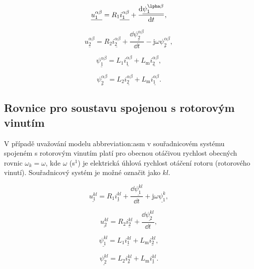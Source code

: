 \documentclass[a4paper, twoside, 11pt]{article}
\begin{document}
 \begin{equation}
     \underline{u_{1}^{\alpha\beta}} = R_1 \underline{i_1^{\alpha\beta}} + \frac{\dd{\underline{\psi_1^{\lpha\beta}}}}{\dd{t}},
    \end{equation}

    \begin{equation}
        \underline{u_{2}^{\alpha\beta}} = R_2 \underline{i_2^{\alpha\beta}} + \frac{\dd{\underline{\psi_2^{\alpha\beta}}}}{\dd{t}} - \text{j} \omega \underline{\psi_2^{\alpha\beta}},
    \end{equation}

    \begin{equation}
        \underline{\psi_1^{\alpha\beta}} = L_1 \underline{i_1^{\alpha\beta}} + L_\text{m} \underline{i_2^{\alpha\beta}},
    \end{equation}

    \begin{equation}
        \underline{\psi_2^{\alpha\beta}} = L_2 \underline{i_2^{\alpha\beta}} + L_\text{m} \underline{i_1^{\alpha\beta}}.
    \end{equation}
    \subsection{Rovnice pro soustavu spojenou s rotorovým vinutím}
    V případě uvažování modelu \gls{abbreviation:asm} v souřadnicovém systému spojeném s rotorovým vinutím platí pro obecnou otáčivou rychlost obecných rovnic $\omega_k = \omega$, kde $\omega$ (s$^{1}$) je elektrická úhlová rychlost otáčení rotoru (rotorového vinutí). Souřadnicový systém je možné označit jako $kl$.\par
 \begin{equation}
     \underline{u_{1}^{kl}} = R_1 \underline{i_1^{kl}} + \frac{\dd{\underline{\psi_1^{kl}}}}{\dd{t}} + \text{j} \omega \underline{\psi_1^{k}},
    \end{equation}

    \begin{equation}
        \underline{u_{2}^{kl}} = R_2 \underline{i_2^{kl}} + \frac{\dd{\underline{\psi_2^{kl}}}}{\dd{t}},
    \end{equation}

    \begin{equation}
        \underline{\psi_1^{kl}} = L_1 \underline{i_1^{kl}} + L_\text{m} \underline{i_2^{kl}},
    \end{equation}

    \begin{equation}
        \underline{\psi_2^{kl}} = L_2 \underline{i_2^{kl}} + L_\text{m} \underline{i_1^{kl}}.
    \end{equation}
\end{document}
